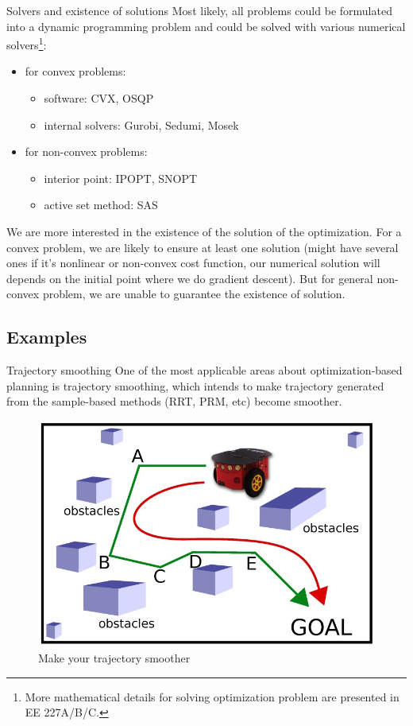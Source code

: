 \documentclass{beamer}
\newcommand{\red}[1]{{\color{red} #1}}
\begin{document}
\begin{frame}{Solvers and existence of solutions}
	Most likely, all problems could be formulated into a dynamic programming problem and could be solved with various numerical solvers\footnote{More mathematical details for solving optimization problem are presented in EE 227A/B/C.}:
	\begin{itemize}
		\item for convex problems:
		\begin{itemize}
			\item software: CVX, OSQP
			\item internal solvers: Gurobi, Sedumi, Mosek  
		\end{itemize}
		\item for non-convex problems:
		\begin{itemize}
			\item interior point: IPOPT, SNOPT
			\item active set method: SAS
		\end{itemize}
	\end{itemize}
	\vspace{\baselineskip}

	We are more interested in the existence of the solution of the optimization. For a convex problem, we are likely to ensure at least one solution (might have several ones if it's nonlinear or non-convex cost function, our numerical solution will depends on the initial point where we do gradient descent). But for general non-convex problem, we are \red{unable to} guarantee the existence of solution. 
\end{frame}

\subsection{Examples}
\begin{frame}{Trajectory smoothing}
	One of the most applicable areas about optimization-based planning is trajectory smoothing, which intends to make trajectory generated from the sample-based methods (RRT, PRM, etc) become smoother.
	\begin{figure}
		\includegraphics[width=0.5\linewidth]{figures/trajectory-smooth.jpg}
		\caption{Make your trajectory smoother}
	\end{figure}
\end{frame}
\end{document}
